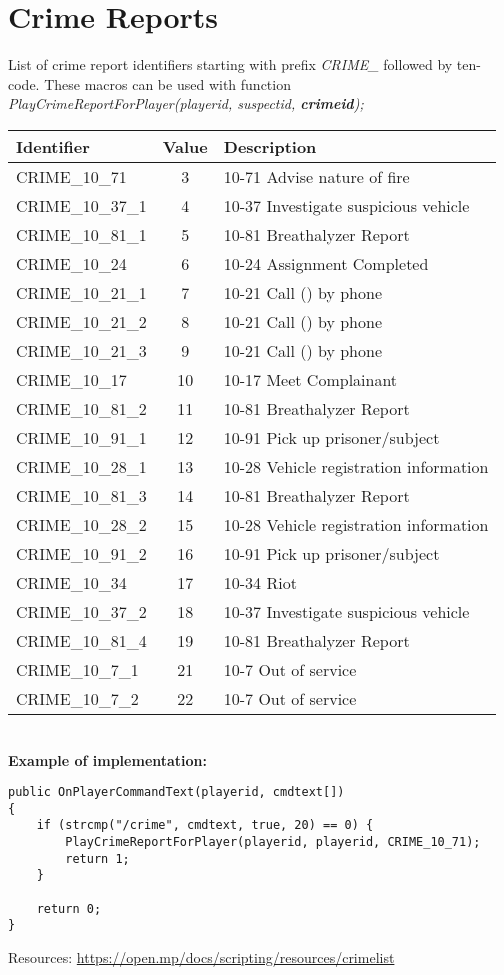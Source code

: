 \documentclass{article}
\begin{document}
\section{Crime Reports}
\begin{sloppypar}
List of crime report identifiers starting with prefix \textit{CRIME\_} followed by ten-code. These macros can be used with function \textit{PlayCrimeReportForPlayer(playerid, suspectid, \textbf{crimeid});}
\end{sloppypar}
\bigskip
\noindent\begin{tabular}{ |l|c|l| } 
\hline
Identifier & Value & Description \\
\hline
CRIME\_10\_71 & 3 & 10-71 Advise nature of fire \\
CRIME\_10\_37\_1 & 4 & 10-37 Investigate suspicious vehicle \\
CRIME\_10\_81\_1 & 5 & 10-81 Breathalyzer Report \\
CRIME\_10\_24 & 6 & 10-24 Assignment Completed \\
CRIME\_10\_21\_1 & 7 & 10-21 Call () by phone \\
CRIME\_10\_21\_2 & 8 & 10-21 Call () by phone \\
CRIME\_10\_21\_3 & 9 & 10-21 Call () by phone \\
CRIME\_10\_17 & 10 & 10-17 Meet Complainant \\
CRIME\_10\_81\_2 & 11 & 10-81 Breathalyzer Report \\
CRIME\_10\_91\_1 & 12 & 10-91 Pick up prisoner/subject \\
CRIME\_10\_28\_1 & 13 & 10-28 Vehicle registration information \\
CRIME\_10\_81\_3 & 14 & 10-81 Breathalyzer Report \\
CRIME\_10\_28\_2 & 15 & 10-28 Vehicle registration information \\
CRIME\_10\_91\_2 & 16 & 10-91 Pick up prisoner/subject \\
CRIME\_10\_34 & 17 & 10-34 Riot \\
CRIME\_10\_37\_2 & 18 & 10-37 Investigate suspicious vehicle \\
CRIME\_10\_81\_4 & 19 & 10-81 Breathalyzer Report \\
CRIME\_10\_7\_1 & 21 & 10-7 Out of service \\
CRIME\_10\_7\_2 & 22 & 10-7 Out of service \\
\hline
\end{tabular}
\bigskip
\\\textbf{Example of implementation:}
\begin{verbatim}
public OnPlayerCommandText(playerid, cmdtext[])
{
    if (strcmp("/crime", cmdtext, true, 20) == 0) {
        PlayCrimeReportForPlayer(playerid, playerid, CRIME_10_71);
        return 1;
    }

    return 0;
}
\end{verbatim}
\bigskip
Resources: \url{https://open.mp/docs/scripting/resources/crimelist}
\end{document}
